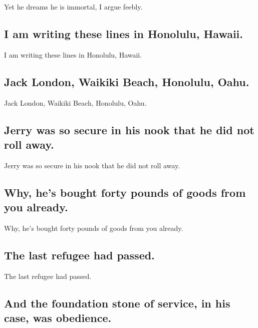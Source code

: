 \documentclass[]{article}
\begin{document}
Yet he dreams he is immortal, I argue feebly.

\hypertarget{i-am-writing-these-lines-in-honolulu-hawaii.}{%
\subsection{I am writing these lines in Honolulu,
Hawaii.}\label{i-am-writing-these-lines-in-honolulu-hawaii.}}

I am writing these lines in Honolulu, Hawaii.

\hypertarget{jack-london-waikiki-beach-honolulu-oahu.}{%
\subsection{Jack London, Waikiki Beach, Honolulu,
Oahu.}\label{jack-london-waikiki-beach-honolulu-oahu.}}

Jack London, Waikiki Beach, Honolulu, Oahu.

\hypertarget{jerry-was-so-secure-in-his-nook-that-he-did-not-roll-away.}{%
\subsection{Jerry was so secure in his nook that he did not roll
away.}\label{jerry-was-so-secure-in-his-nook-that-he-did-not-roll-away.}}

Jerry was so secure in his nook that he did not roll away.

\hypertarget{why-hes-bought-forty-pounds-of-goods-from-you-already.}{%
\subsection{Why, he's bought forty pounds of goods from you
already.}\label{why-hes-bought-forty-pounds-of-goods-from-you-already.}}

Why, he's bought forty pounds of goods from you already.

\hypertarget{the-last-refugee-had-passed.}{%
\subsection{The last refugee had
passed.}\label{the-last-refugee-had-passed.}}

The last refugee had passed.

\hypertarget{and-the-foundation-stone-of-service-in-his-case-was-obedience.}{%
\subsection{And the foundation stone of service, in his case, was
obedience.}\label{and-the-foundation-stone-of-service-in-his-case-was-obedience.}}
\end{document}
